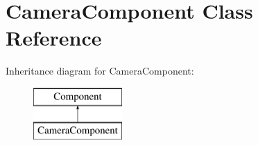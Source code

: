 \hypertarget{class_camera_component}{\section{Camera\+Component Class Reference}
\label{class_camera_component}
}
Inheritance diagram for Camera\+Component\+:\begin{figure}[H]
\begin{center}
\leavevmode
\includegraphics[height=2.000000cm]{class_camera_component}
\end{center}
\end{figure}
